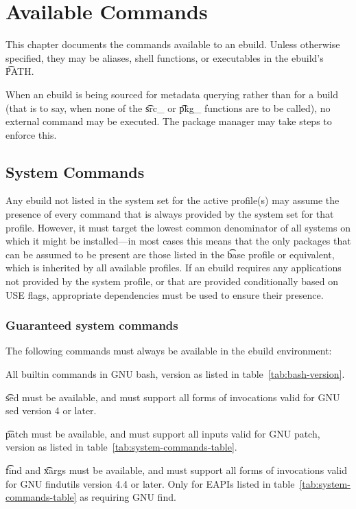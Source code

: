 \chapter{Available Commands}

This chapter documents the commands available to an ebuild. Unless otherwise specified, they may be
aliases, shell functions, or executables in the ebuild's \t{PATH}.

When an ebuild is being sourced for metadata querying rather than for a build (that is to say,
when none of the \t{src_} or \t{pkg_} functions are to be called), no external command may
be executed. The package manager may take steps to enforce this.

\section{System Commands}

Any ebuild not listed in the system set for the active profile(s) may assume the presence of every
command that is always provided by the system set for that profile. However, it must target the
lowest common denominator of all systems on which it might be installed---in most cases this means
that the only packages that can be assumed to be present are those listed in the \t{base} profile or
equivalent, which is inherited by all available profiles. If an ebuild requires any applications not
provided by the system profile, or that are provided conditionally based on USE flags, appropriate
dependencies must be used to ensure their presence.

\subsection{Guaranteed system commands}
\label{sec:guaranteed-system-commands}

The following commands must always be available in the ebuild environment:
\nobreakpar
\begin{compactitem}
\item All builtin commands in GNU bash, version as listed in table~\ref{tab:bash-version}.
\item \t{sed} must be available, and must support all forms of invocations valid for GNU sed
    version 4 or later.
\item {} \t{patch} must be available, and must support all inputs valid
    for GNU patch, version as listed in table~\ref{tab:system-commands-table}.
\item {} \t{find} and \t{xargs} must be available, and must support all forms
    of invocations valid for GNU findutils version 4.4 or later. Only for EAPIs listed in
    table~\ref{tab:system-commands-table} as requiring GNU find.
\end{compactitem}

